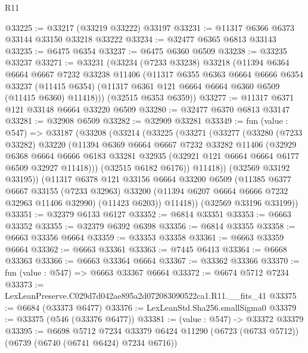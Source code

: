 \begin{lexlean}{R11}
\begin{coremodule}
@33225 := @33217 (@33219 @33222) @33197
@33231 := @11317 @6366 @6373 @33144 @33150 @33218 @33222
@33234 := @32477 @6365 @6813 @33143
@33235 := @6475 @6354
@33237 := @6475 @6360 @6509
@33238 := @33235 @33237
@33271 := @33231
    (@33234
      (@7233 @33238)
      @33218
      (@11394
        @6364
        @6664
        @6667
        @7232
        @33238
        @11406
        (@11317
          @6355
          @6363
          @6664
          @6666
          @6354
          @33237
          (@11415 @6354)
          (@11317 @6361 @121 @6664 @6664 @6360 @6509 (@11415 @6360) @11418)))
      (@32515 @6353 @6359))
@33277 := @11317 @6371 @121 @33148 @6664 @33220 @6509
@33280 := @32477 @6370 @6813 @33147
@33281 := @32908 @6509
@33282 := @32909 @33281
@33349 := fun (value : @547) =>
  @33187
    (@33208
      (@33214
        (@33225
          (@33271
            (@33277
              (@33280
                (@7233 @33282)
                @33220
                (@11394
                  @6369
                  @6664
                  @6667
                  @7232
                  @33282
                  @11406
                  (@32929
                    @6368
                    @6664
                    @6666
                    @6183
                    @33281
                    @32935
                    (@32921 @121 @6664 @6664 @6177 @6509 @32927 @11418)))
                (@32515 @6182 @6176))
              @11418))
          (@32569 @33192 @33195))
        (@11317
          @6378
          @121
          @33156
          @6664
          @33200
          @6509
          (@11385
            @6377
            @6667
            @33155
            (@7233 @32963)
            @33200
            (@11394 @6207 @6664 @6666 @7232 @32963 @11406 @32990)
            (@11423 @6203))
          @11418))
      (@32569 @33196 @33199))
@33351 := @32379 @6133 @6127
@33352 := @6814 @33351
@33353 := @6663 @33352
@33355 := @32379 @6392 @6398
@33356 := @6814 @33355
@33358 := @6663 @33356 @6664
@33359 := @33353 @33358
@33361 := @6663 @33359 @6664
@33362 := @6663 @33361
@33363 := @7445 @6413
@33364 := @6668 @33363
@33366 := @6663 @33364 @6664
@33367 := @33362 @33366
@33370 := fun (value : @547) => @6663 @33367 @6664
@33372 := @6674 @5712 @7234
@33373 := LexLeanPreserve.C029d7d042ae895a2d072083090522ca1.R11.__fits_41
@33375 := @6684 (@33373 @6477)
@33376 := LexLeanStd.Sha256.smallSigma0
@33379 := @33375 (@546 (@33376 @6477))
@33381 := (value : @547) -> @33372 @33379
@33395 := @6698
    @5712
    @7234
    @33379
    @6424
    @11290
    (@6723 (@6733 @5712))
    (@6739 (@6740 (@6741 @6424) @7234 @6716))

\end{coremodule}
\end{lexlean}

